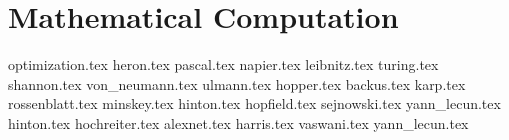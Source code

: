 \part{Mathematical Computation}
{optimization.tex}
{heron.tex}
{pascal.tex}
{napier.tex}
{leibnitz.tex}
{turing.tex}
{shannon.tex}
{von_neumann.tex}
{ulmann.tex}
{hopper.tex}
{backus.tex}
{karp.tex}
{rossenblatt.tex}
{minskey.tex}
{hinton.tex}
{hopfield.tex}
{sejnowski.tex}
{yann_lecun.tex}
{hinton.tex}
{hochreiter.tex}
{alexnet.tex}
{harris.tex}
{vaswani.tex}
{yann_lecun.tex}